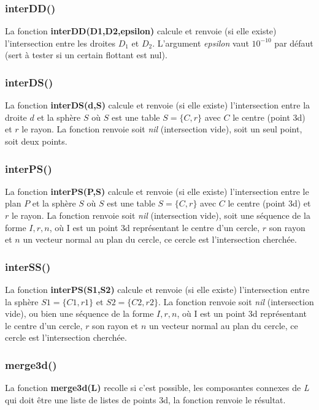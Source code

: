 \subsubsection{interDD()}
La fonction \textbf{interDD(D1,D2,epsilon)} calcule et renvoie (si elle existe) l'intersection entre les droites $D_1$ et $D_2$. L'argument \emph{epsilon} vaut $10^{-10}$ par défaut (sert à tester si un certain flottant est nul).

\subsubsection{interDS()}
La fonction \textbf{interDS(d,S)} calcule et renvoie (si elle existe) l'intersection entre la droite $d$ et la sphère $S$ où $S$ est une table $S=\{C,r\}$ avec $C$ le centre (point 3d) et $r$ le rayon. La fonction renvoie soit \emph{nil} (intersection vide), soit un seul point, soit deux points.

\subsubsection{interPS()}
La fonction \textbf{interPS(P,S)} calcule et renvoie (si elle existe) l'intersection entre le plan $P$ et la sphère $S$ où $S$ est une table $S=\{C,r\}$ avec $C$ le centre (point 3d) et $r$ le rayon. La fonction renvoie soit \emph{nil} (intersection vide), soit une séquence de la forme $I,r,n$, où I est un point 3d représentant le centre d'un cercle, $r$ son rayon et $n$ un vecteur normal au plan du cercle, ce cercle est l'intersection cherchée. 

\subsubsection{interSS()}
La fonction \textbf{interPS(S1,S2)} calcule et renvoie (si elle existe) l'intersection entre la sphère $S1=\{C1,r1\}$ et $S2=\{C2,r2\}$. La fonction renvoie soit \emph{nil} (intersection vide), ou bien une séquence de la forme $I,r,n$, où I est un point 3d représentant le centre d'un cercle, $r$ son rayon et $n$ un vecteur normal au plan du cercle, ce cercle est l'intersection cherchée. 

\subsubsection{merge3d()}
La fonction \textbf{merge3d(L)} recolle si c'est possible, les composantes connexes de \emph{L} qui doit être une liste de listes de points 3d, la fonction renvoie le résultat.


